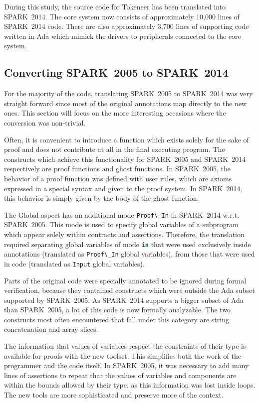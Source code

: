 \documentclass[10pt,a4paper,twocolumn]{article}
\newcommand{\oldspark}{SPARK~2005\xspace}
\newcommand{\newspark}{SPARK~2014\xspace}
\newcommand{\wrt}{w.r.t.\xspace}
\newcommand{\SPARK}[1]{\lstinline[language=Ada,basicstyle={\footnotesize
      \sffamily},framesep=0pt]$#1$}
\begin{document}
During this study, the source code for Tokeneer has been translated
into \newspark. The core system now consists of approximately 10,000
lines of \newspark code. There are also approximately 3,700 lines of
supporting code written in Ada which mimick the drivers to
peripherals connected to the core system.

\subsection{Converting \oldspark to \newspark}

For the majority of the code, translating \oldspark to \newspark was
very straight forward since most of the original annotations map
directly to the new ones. This section will focus on the more
interesting occasions where the conversion was non-trivial.

Often, it is convenient to introduce a function which exists
solely for the sake of proof and does not contribute at all in
the final executing program. The constructs which achieve this
functionality for \oldspark and \newspark respectively are proof
functions and ghost functions. In \oldspark, the behavior of a proof
function was defined with user rules, which are axioms expressed in a special
syntax and given to the proof system. In \newspark, this
behavior is simply given by the body of the ghost function.

The Global aspect has an additional mode \SPARK{Proof\_In} in \newspark \wrt
\oldspark. This mode is used to specify global variables of a subprogram which
appear solely within contracts and assertions. Therefore, the translation
required separating global variables of mode \SPARK{in} that were used
exclusively inside annotations (translated as \SPARK{Proof\_In} global
variables), from those that were used in code (translated as \SPARK{Input}
global variables).

Parts of the original code were specially annotated to be ignored during formal
verification, because they contained constructs which were outside the Ada
subset supported by \oldspark. As \newspark supports a bigger subset of Ada
than \oldspark, a lot of this code is now formally analyzable. The two
constructs most often encountered that fall under this category are string
concatenation and array slices.

The information that values of variables respect the constraints of their type
is available for proofs with the new toolset. This simplifies both the work of
the programmer and the code itself.  In \oldspark, it was necessary to add many
lines of assertions to repeat that the values of variables and components are
within the bounds allowed by their type, as this information was lost inside
loops.  The new tools are more sophisticated and preserve more of the context.
\end{document}

